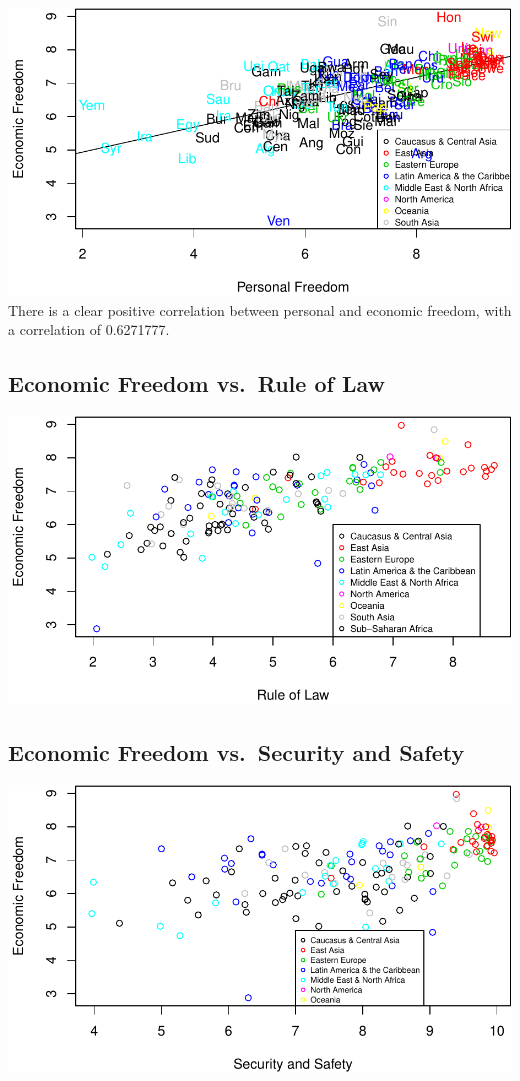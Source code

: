 \documentclass[]{article}
\begin{document}
\includegraphics{final_presentation_files/figure-latex/fig1-1.pdf} There
is a clear positive correlation between personal and economic freedom,
with a correlation of 0.6271777.

\hypertarget{economic-freedom-vs.rule-of-law}{%
\subsection{Economic Freedom vs.~Rule of
Law}\label{economic-freedom-vs.rule-of-law}}

\includegraphics{final_presentation_files/figure-latex/unnamed-chunk-3-1.pdf}

\hypertarget{economic-freedom-vs.security-and-safety}{%
\subsection{Economic Freedom vs.~Security and
Safety}\label{economic-freedom-vs.security-and-safety}}

\includegraphics{final_presentation_files/figure-latex/unnamed-chunk-4-1.pdf}
\end{document}
